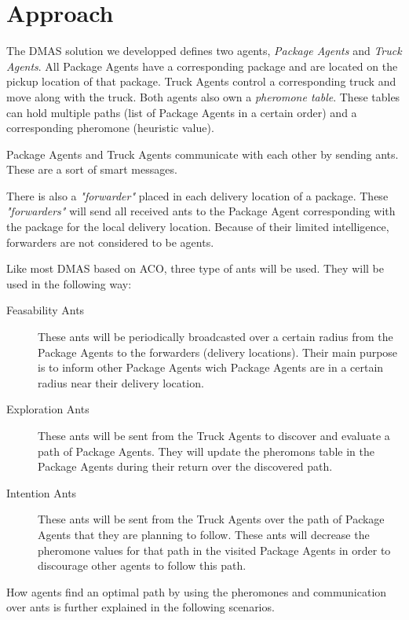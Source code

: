 \section{Approach}
\label{sec:approach}

The DMAS solution we developped defines two agents, \emph{Package Agents} and
\emph{Truck Agents}. All Package Agents have a corresponding package and are
located on the pickup location of that package. Truck Agents control a
corresponding truck and move along with the truck. Both agents also own a
\emph{pheromone table}. These tables can hold multiple paths (list of Package
Agents in a certain order) and a corresponding pheromone (heuristic value).

\npar Package Agents and Truck Agents communicate with each other by sending
ants. These are a sort of smart messages.

\npar There is also a \emph{"forwarder"} placed in each delivery location of a
package. These \emph{"forwarders"} will send all received ants to the Package
Agent corresponding with the package for the local delivery location. Because of
their limited intelligence, forwarders are not considered to be agents.

\npar Like most DMAS based on ACO, three type of ants will be used. They will be
used in the following way:

\begin{description}
	\item[Feasability Ants] These ants will be periodically broadcasted
	over a certain radius from the Package Agents to the forwarders (delivery
	locations). Their main purpose is to inform other Package Agents wich Package
	Agents are in a certain radius near their delivery location.

	\item[Exploration Ants] These ants will be sent from the Truck Agents
	to discover and evaluate a path of Package Agents. They will update the
	pheromons table in the Package Agents during their return over the discovered
	path.
	
	\item[Intention Ants] These ants will be sent from the Truck Agents
	over the path of Package Agents that they are planning to follow. These ants
	will decrease the pheromone values for that path in the visited Package Agents
	in order to discourage other agents to follow this path.
\end{description}

\npar How agents find an optimal path by using the pheromones and communication
over ants is further explained in the following scenarios.

